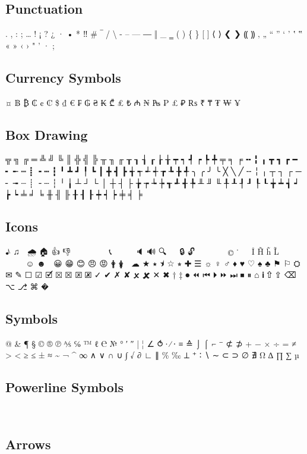 \subsection{Punctuation}

. , : ; … ! ¡ ? ¿ · • * ‼ \# ‾ / \textbackslash{} - – — ― ‖ \_ ‗ ( ) \{ \} [ ] ⟨ ⟩ ❮ ❯ ⸨ ⸩ ‚ „ “ ” ‘ ’ ‛ ‟ « » ‹ › " ' · ;

\subsection{Currency Symbols}

¤ ฿ ₿ ₵ ¢ ₡ \$ ₫ € ₣ ₲ ₴ ₭ ₾ ₤ ₺ ₼ ₦ ₧ ₱ £ ₽ ₨ ₹ ₸ ₮ ₩ ¥

\subsection{Box Drawing}

╦ ╗ ╔ ═ ╩ ╝ ╚ ║ ╬ ╣ ╠ ╥ ╖ ╓ ┰ ┒ ┧ ┎ ┟ ╁ ┯ ┑ ┩ ┍ ┡ ╇ ╤ ╕ ╒ ╍ ╏ ╻ ┳ ┓ ┏ ━ ╸ ╾ ┉ ┋ ╺ ┅ ┇ ╹ ┻ ┛ ╿ ┗ ┃ ╋ ┫ ┣ ╅ ┭ ┵ ┽ ┲ ┺ ╊ ╃ ╮ ╭ ╯ ╰ ╳ ╲ ╱ ╌ ╎ ╷ ┬ ┐ ┌ ─ ╴ ╼ ┈ ┊ ╶ ┄ ┆ ╵ ╽ ┴ ┘ └ │ ┼ ┤ ├ ╆ ┮ ┶ ┾ ┱ ┹ ╉ ╄ ╨ ╜ ╙ ╀ ┸ ┦ ┚ ┞ ┖ ╈ ┷ ┪ ┙ ┢ ┕ ╧ ╛ ╘ ╫ ╢ ╟ ╂ ┨ ┠ ┿ ┥ ┝ ╪ ╡ ╞

\subsection{Icons}

♪ ♫ 🌙 🌧 🏠 👍 👎 👤 💬 💾 📀 📁 📂 📆 📞 📱 📶 🔀 🔁 🔈 🔊 🔍 🔎 🔑 🔒 🔓 🖤 🗀 🗁 🗑 🗕 🗖                  ☺ ☻ ☹ 😀 😁 😊 😠 😡 🛉 🛊 🛒 ☁ ★ ⭑ ⯨ ☆ ⭒ ✚ ☰ ☼ ♀ ♂ ♦ ♥ ♡ ♠ ♣ ⚑ ⚐ ⛭ ✉ ✎ ☐ ☑ 🗹 ⮽ ☒ 🗵 🗷 ✓ ✔ ✗ ✘ 🗴 🗶 ✕ ✖ † ‡ ⏺ ⏪ ⏮ ⏵ ⏩ ⏭ ⏹ ⏸ ⌂ ℹ ⇧ ⇪ ⌫ ⌥ ⎇ ⌘ �

\subsection{Symbols}

@ \& ¶ § © ® ℗ ⅍ ℅ ™ ℓ ℮ № ° ′ ″ | ¦ ∠ ⥀ ∙ ∕ ⋅ ≡ ≙ ⌡ ⌠ ⌐ ⁻ ⊄ ⊅ + − × ÷ = ≠ > < ≥ ≤ ± ≈ \~{} ¬ \textasciicircum{} ∞ ∧ ∨ ∩ ∪ ∫ √ ∂ ∟ ∥ \% ‰ ⟂ ⁺ ∶ ∖ ∼ ⊂ ⊃ ∅ ∄ Ω ∆ ∏ ∑ µ

\subsection{Powerline Symbols}

        ㏑

\subsection{Arrows}

